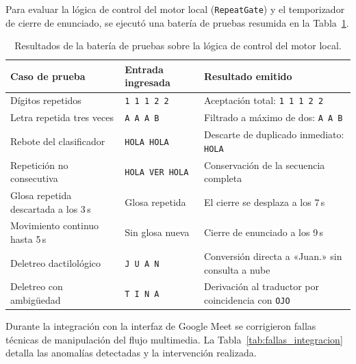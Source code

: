 Para evaluar la lógica de control del motor local (\texttt{RepeatGate}) y el temporizador de cierre de enunciado, se ejecutó una batería de pruebas resumida en la Tabla~\ref{tab:bateria_logica}.

\begin{table}[H]
    \centering
    \small
    \caption{Resultados de la batería de pruebas sobre la lógica de control del motor local.}
    \label{tab:bateria_logica}
    \begin{tabularx}{\textwidth}{l l X}
        \toprule
        \textbf{Caso de prueba} & \textbf{Entrada ingresada} & \textbf{Resultado emitido} \\
        \midrule
        Dígitos repetidos & \texttt{1 1 1 2 2} & Aceptación total: \texttt{1 1 1 2 2} \\
        Letra repetida tres veces & \texttt{A A A B} & Filtrado a máximo de dos: \texttt{A A B} \\
        Rebote del clasificador & \texttt{HOLA HOLA} & Descarte de duplicado inmediato: \texttt{HOLA} \\
        Repetición no consecutiva & \texttt{HOLA VER HOLA} & Conservación de la secuencia completa \\
        Glosa repetida descartada a los 3\,s & Glosa repetida & El cierre se desplaza a los 7\,s \\
        Movimiento continuo hasta 5\,s & Sin glosa nueva & Cierre de enunciado a los 9\,s \\
        Deletreo dactilológico & \texttt{J U A N} & Conversión directa a «Juan.» sin consulta a nube \\
        Deletreo con ambigüedad & \texttt{T I N A} & Derivación al traductor por coincidencia con \texttt{OJO} \\
        \bottomrule
    \end{tabularx}
\end{table}

Durante la integración con la interfaz de Google Meet se corrigieron fallas técnicas de manipulación del flujo multimedia. La Tabla~\ref{tab:fallas_integracion} detalla las anomalías detectadas y la intervención realizada.

